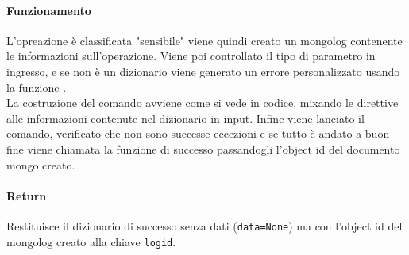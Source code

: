 \documentclass[11pt]{article}
\begin{document}
\paragraph{Funzionamento}
L'opreazione è classificata "sensibile" viene quindi creato un mongolog contenente le informazioni sull'operazione.
Viene poi controllato il tipo di parametro in ingresso, e se non è un dizionario viene generato un errore personalizzato
usando la funzione .\\
La costruzione del comando avviene come si vede in codice, mixando le direttive alle informazioni contenute
nel dizionario in input. Infine viene lanciato il comando, verificato che non sono successe eccezioni e se tutto
è andato a buon fine viene chiamata la funzione di successo passandogli l'object id del documento mongo creato.
\paragraph{Return}
Restituisce il dizionario di successo senza dati (\texttt{data=None}) ma con l'object id del mongolog creato
alla chiave \texttt{logid}.
\end{document}
